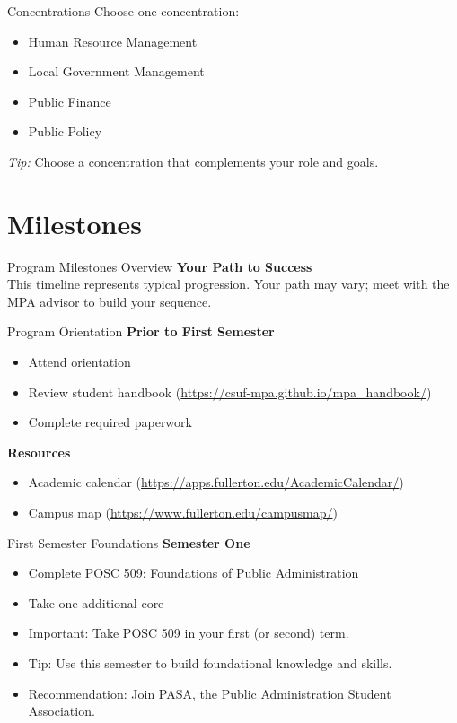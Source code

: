 \documentclass[10pt]{beamer}
\begin{document}
\begin{frame}{Concentrations}
Choose one concentration:
\begin{itemize}
  \item Human Resource Management
  \item Local Government Management
  \item Public Finance
  \item Public Policy
\end{itemize}
\emph{Tip:} Choose a concentration that complements your role and goals.
\end{frame}

\section{\textcolor{titanorange}{Milestones}}
\begin{frame}{Program Milestones Overview}
\centering
\textbf{Your Path to Success}\\[4pt]
\small This timeline represents typical progression. Your path may vary; meet with the MPA advisor to build your sequence.
\end{frame}

\begin{frame}{Program Orientation}
\textbf{Prior to First Semester}
\begin{itemize}
  \item Attend orientation
  \item Review student handbook \small(\url{https://csuf-mpa.github.io/mpa_handbook/})
  \item Complete required paperwork
\end{itemize}
\textbf{Resources}
\begin{itemize}
  \item Academic calendar \small(\url{https://apps.fullerton.edu/AcademicCalendar/})
  \item Campus map \small(\url{https://www.fullerton.edu/campusmap/})
\end{itemize}
\end{frame}

\begin{frame}{First Semester Foundations}
\textbf{Semester One}
\begin{itemize}
  \item Complete POSC 509: Foundations of Public Administration
  \item Take one additional core
\end{itemize}
\begin{itemize}
  \item \alert{Important:} Take POSC 509 in your first (or second) term.
  \item \alert{Tip:} Use this semester to build foundational knowledge and skills.
  \item \alert{Recommendation:} Join PASA, the Public Administration Student Association.
\end{itemize}
\end{frame}
\end{document}
